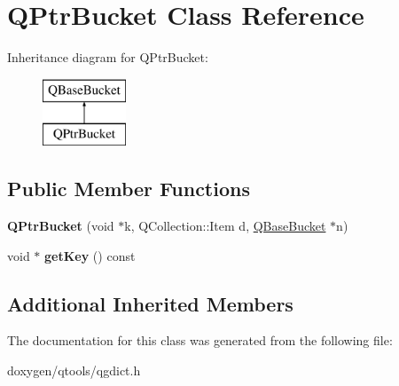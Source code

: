 \hypertarget{class_q_ptr_bucket}{}\section{Q\+Ptr\+Bucket Class Reference}
\label{class_q_ptr_bucket}
Inheritance diagram for Q\+Ptr\+Bucket\+:\begin{figure}[H]
\begin{center}
\leavevmode
\includegraphics[height=2.000000cm]{class_q_ptr_bucket}
\end{center}
\end{figure}
\subsection*{Public Member Functions}
\begin{DoxyCompactItemize}
\item 
\mbox{\label{class_q_ptr_bucket_a5574510294fe579bdf15f1273ea79a62}} 
{\bfseries Q\+Ptr\+Bucket} (void $\ast$k, Q\+Collection\+::\+Item d, \mbox{\hyperlink{class_q_base_bucket}{Q\+Base\+Bucket}} $\ast$n)
\item 
\mbox{\label{class_q_ptr_bucket_aaf3562021c68078ed44e39a03a22dc70}} 
void $\ast$ {\bfseries get\+Key} () const
\end{DoxyCompactItemize}
\subsection*{Additional Inherited Members}


The documentation for this class was generated from the following file\+:\begin{DoxyCompactItemize}
\item 
doxygen/qtools/qgdict.\+h\end{DoxyCompactItemize}
